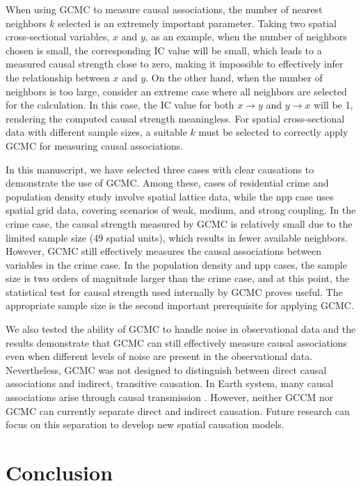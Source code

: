 \documentclass[authoryear,preprint,review,12pt]{elsarticle}
\begin{document}
When using GCMC to measure causal associations, the number of nearest neighbors \(k\) selected is an extremely important parameter. Taking two spatial cross-sectional variables, \(x\) and \(y\), as an example, when the number of neighbors chosen is small, the corresponding IC value will be small, which leads to a measured causal strength close to zero, making it impossible to effectively infer the relationship between \(x\) and \(y\). On the other hand, when the number of neighbors is too large, consider an extreme case where all neighbors are selected for the calculation. In this case, the IC value for both \(x \to y\) and \(y \to x\) will be 1, rendering the computed causal strength meaningless. For spatial cross-sectional data with different sample sizes, a suitable \(k\) must be selected to correctly apply GCMC for measuring causal associations.

In this manuscript, we have selected three cases with clear causations to demonstrate the use of GCMC. Among these, cases of residential crime and population density study involve spatial lattice data, while the npp case uses spatial grid data, covering scenarios of weak, medium, and strong coupling. In the crime case, the causal strength measured by GCMC is relatively small due to the limited sample size (49 spatial units), which results in fewer available neighbors. However, GCMC still effectively measures the causal associations between variables in the crime case. In the population density and npp cases, the sample size is two orders of magnitude larger than the crime case, and at this point, the statistical test for causal strength used internally by GCMC proves useful. The appropriate sample size is the second important prerequisite for applying GCMC. 

We also tested the ability of GCMC to handle noise in observational data and the results demonstrate that GCMC can still effectively measure causal associations even when different levels of noise are present in the observational data. Nevertheless, GCMC was not designed to distinguish between direct causal associations and indirect, transitive causation. In Earth system, many causal associations arise through causal transmission \citep{runge2019esstsc,runge2023tsc}. However, neither GCCM nor GCMC can currently separate direct and indirect causation. Future research can focus on this separation to develop new spatial causation models.

\section{Conclusion}\label{sec5} 
\end{document}
